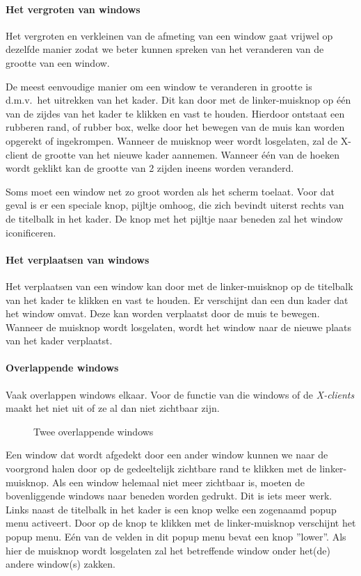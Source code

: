 \paragraph{Het vergroten van windows}
\label{Het vergroten van windows}
Het vergroten en verkleinen van de afmeting van een window gaat vrijwel
op dezelfde manier zodat we beter kunnen spreken van het veranderen van
de grootte van een window.

De meest eenvoudige manier om een window te veranderen in grootte is
d.m.v.\ het uitrekken van het kader.
Dit kan door met de linker-muisknop
op \'e\'en van de zijdes van het kader te klikken en vast te houden.
Hierdoor ontstaat een rubberen rand, of rubber box, welke door het bewegen
van de muis kan worden opgerekt of ingekrompen. Wanneer de muisknop weer
wordt losgelaten, zal de X-client de grootte van het nieuwe kader aannemen.
Wanneer \'e\'en van de hoeken wordt geklikt kan de grootte van 2 zijden ineens
worden veranderd.

Soms moet een window net zo groot worden als het scherm toelaat.
Voor dat geval is er een speciale knop, pijltje omhoog, die zich bevindt uiterst rechts van de titelbalk
in het kader. De knop met het pijltje naar beneden zal het window iconificeren.
\paragraph{Het verplaatsen van windows}
Het verplaatsen van een window kan door met de linker-muisknop op
de titelbalk van het kader te klikken en vast te houden. Er verschijnt 
dan een dun kader dat het window omvat. Deze kan worden verplaatst door 
de muis te bewegen. Wanneer de muisknop wordt losgelaten, wordt het window
naar de nieuwe plaats van het kader verplaatst.
\paragraph{Overlappende windows}
Vaak overlappen windows elkaar.
Voor de functie van die windows of de {\em X-clients} maakt het
niet uit of ze al dan niet zichtbaar zijn.
\begin{figure}
\centerline{}
\caption{Twee overlappende windows
\label{overlap}}
\end{figure}
Een window dat wordt afgedekt door een ander window kunnen we naar de 
voorgrond halen door op de gedeeltelijk zichtbare rand te klikken
met de linker-muisknop.
Als een window helemaal niet meer zichtbaar is, moeten de bovenliggende
windows naar beneden worden gedrukt. Dit is iets meer werk. Links naast
de titelbalk in het kader is een knop welke een zogenaamd popup menu
activeert. Door op de knop te klikken met de linker-muisknop verschijnt
het popup menu. 
E\'en van de velden in dit popup menu bevat een knop ''lower''. 
Als hier de muisknop wordt losgelaten zal het betreffende window onder
het(de) andere window(s) zakken.
